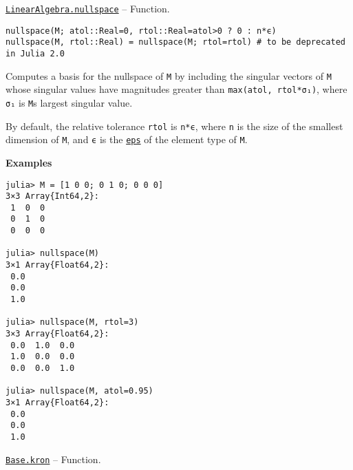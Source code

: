 \hypertarget{13997374044866220350}{} 
\hyperlink{13997374044866220350}{\texttt{LinearAlgebra.nullspace}}  -- {Function.}

\begin{adjustwidth}{2em}{0pt}


\begin{verbatim}
nullspace(M; atol::Real=0, rtol::Real=atol>0 ? 0 : n*ϵ)
nullspace(M, rtol::Real) = nullspace(M; rtol=rtol) # to be deprecated in Julia 2.0
\end{verbatim}

Computes a basis for the nullspace of \texttt{M} by including the singular vectors of \texttt{M} whose singular values have magnitudes greater than \texttt{max(atol, rtol*σ₁)}, where \texttt{σ₁} is \texttt{M}{\textquotesingle}s largest singular value.

By default, the relative tolerance \texttt{rtol} is \texttt{n*ϵ}, where \texttt{n} is the size of the smallest dimension of \texttt{M}, and \texttt{ϵ} is the \hyperlink{4594213520310841636}{\texttt{eps}} of the element type of \texttt{M}.

\textbf{Examples}


\begin{verbatim}
julia> M = [1 0 0; 0 1 0; 0 0 0]
3×3 Array{Int64,2}:
 1  0  0
 0  1  0
 0  0  0

julia> nullspace(M)
3×1 Array{Float64,2}:
 0.0
 0.0
 1.0

julia> nullspace(M, rtol=3)
3×3 Array{Float64,2}:
 0.0  1.0  0.0
 1.0  0.0  0.0
 0.0  0.0  1.0

julia> nullspace(M, atol=0.95)
3×1 Array{Float64,2}:
 0.0
 0.0
 1.0
\end{verbatim}



\end{adjustwidth}
\hypertarget{14153417388267953812}{} 
\hyperlink{14153417388267953812}{\texttt{Base.kron}}  -- {Function.}

